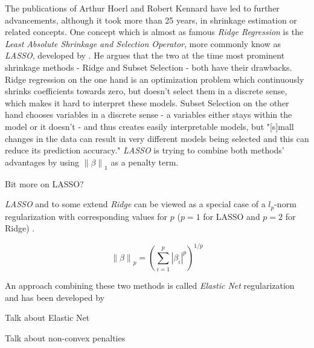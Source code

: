 \documentclass[12pt,a4paper]{article}
\newenvironment{lightbluebox}{%
    \begin{tcolorbox}[colback=lightblue, colframe=lightblue, fontupper=\itshape]%
}{%
    \end{tcolorbox}%
}
\newcommand{\norm}[1]{\left\lVert#1\right\rVert}
\begin{document}
The publications of Arthur Hoerl and Robert Kennard have led to further advancements, although it took more than 25 years, in shrinkage estimation or related concepts. One concept which is almost as famous \textit{Ridge Regression} is the \textit{Least Absolute Shrinkage and Selection Operator}, more commonly know as \textit{LASSO}, developed by \textcite{Tibishirani1996}. He argues that the two at the time most prominent shrinkage methods - Ridge and Subset Selection - both have their drawbacks. Ridge regression on the one hand is an optimization problem which continuously shrinks coefficients towards zero, but doesn't select them in a discrete sense, which makes it hard to interpret these models. Subset Selection on the other hand chooses variables in a discrete sense - a variables either stays within the model or it doesn't - and thus creates easily interpretable models, but "[s]mall changes in the data can result in very different models being selected and this can reduce its prediction accuracy." \parencite{Tibishirani1996} \textit{LASSO} is trying to combine both methods' advantages by using $\norm{\beta}_1$ as a penalty term.\\
\begin{lightbluebox}
Bit more on LASSO?
\end{lightbluebox}

\textit{LASSO} and to some extend \textit{Ridge} can be viewed as a special case of a $l_p$-norm regularization with corresponding values for $p$ ($p = 1$ for LASSO and $p=2$ for Ridge) \parencite{FrankFriedman1993}. 

$$\norm{\beta}_p =  \left(\sum_{i=1}^p|\beta_i|^p\right)^{1/p}$$

An approach combining these two methods is called \textit{Elastic Net} regularization and has been developed by \\
\begin{lightbluebox}
Talk about Elastic Net
\end{lightbluebox}

\begin{lightbluebox}
Talk about non-convex penalties
\end{lightbluebox}
\end{document}
